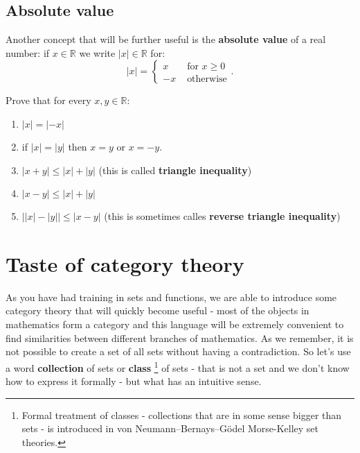\subsection{Absolute value}

Another concept that will be further useful is the \textbf{absolute value} of a real number:
if $x\in \mathbb R$ we write $|x|\in \mathbb R$ for:
$$|x| = \begin{cases}x &\text{ for } x \ge 0\\ -x &\text{ otherwise} \end{cases}.$$

\begin{prob}
  Prove that for every $x,y\in \mathbb R$:
  \begin{enumerate}
    \item $|x|=|-x|$
    \item if $|x|=|y|$ then $x=y$ or $x=-y$.
    \item $|x+y| \le |x| + |y|$ (this is called \textbf{triangle inequality})
    \item $|x-y|\le |x| + |y|$
    \item $\left||x| - |y|\right|\le |x-y|$ (this is sometimes calles \textbf{reverse triangle inequality})
  \end{enumerate}
\end{prob}

\section{Taste of category theory}
As you have had training in sets and functions, we are able to introduce some category theory that will quickly become useful - most of the objects in mathematics form a
category and this language will be extremely convenient to find similarities between different branches of mathematics.
As we remember, it is not possible to create a set of all sets without having a contradiction. So let's use a word \textbf{collection} of sets or \textbf{class}
\footnote{Formal treatment of classes - collections that are in some sense bigger than sets - is introduced in von Neumann–Bernays–Gödel Morse-Kelley set theories.}
 of sets - that is not a set and we don't know how to express it formally - but what has an intuitive sense.

